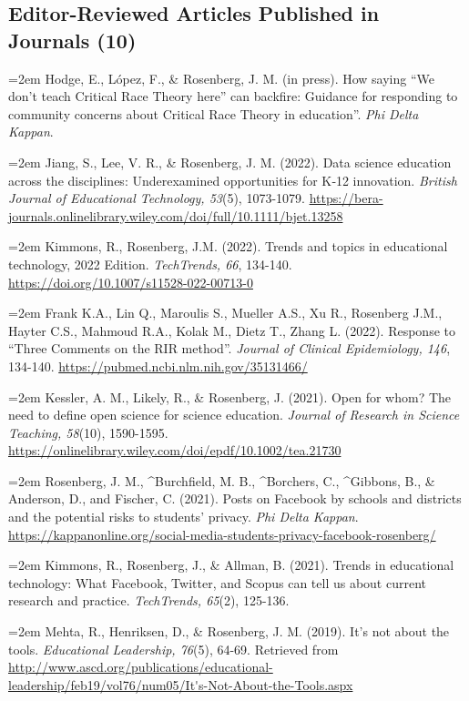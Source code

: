 \documentclass[
  14,
]{article}
\begin{document}
\hypertarget{editor-reviewed-articles-published-in-journals-10}{%
\subsection{Editor-Reviewed Articles Published in Journals
(10)}\label{editor-reviewed-articles-published-in-journals-10}}

\hangindent=2em Hodge, E., López, F., \& Rosenberg, J. M. (in press).
How saying ``We don't teach Critical Race Theory here'' can backfire:
Guidance for responding to community concerns about Critical Race Theory
in education''. \emph{Phi Delta Kappan}.

\hangindent=2em Jiang, S., Lee, V. R., \& Rosenberg, J. M. (2022). Data
science education across the disciplines: Underexamined opportunities
for K‐12 innovation. \emph{British Journal of Educational Technology,
53}(5), 1073-1079.
\url{https://bera-journals.onlinelibrary.wiley.com/doi/full/10.1111/bjet.13258}

\hangindent=2em Kimmons, R., Rosenberg, J.M. (2022). Trends and topics
in educational technology, 2022 Edition. \emph{TechTrends, 66}, 134-140.
\url{https://doi.org/10.1007/s11528-022-00713-0}

\hangindent=2em Frank K.A., Lin Q., Maroulis S., Mueller A.S., Xu R.,
Rosenberg J.M., Hayter C.S., Mahmoud R.A., Kolak M., Dietz T., Zhang L.
(2022). Response to ``Three Comments on the RIR method''. \emph{Journal
of Clinical Epidemiology, 146}, 134-140.
\url{https://pubmed.ncbi.nlm.nih.gov/35131466/}

\hangindent=2em Kessler, A. M., Likely, R., \& Rosenberg, J. (2021).
Open for whom? The need to define open science for science education.
\emph{Journal of Research in Science Teaching, 58}(10), 1590-1595.
\url{https://onlinelibrary.wiley.com/doi/epdf/10.1002/tea.21730}

\hangindent=2em Rosenberg, J. M., \^{}Burchfield, M. B., \^{}Borchers,
C., \^{}Gibbons, B., \& Anderson, D., and Fischer, C. (2021). Posts on
Facebook by schools and districts and the potential risks to students'
privacy. \emph{Phi Delta Kappan}.
\url{https://kappanonline.org/social-media-students-privacy-facebook-rosenberg/}

\hangindent=2em Kimmons, R., Rosenberg, J., \& Allman, B. (2021). Trends
in educational technology: What Facebook, Twitter, and Scopus can tell
us about current research and practice. \emph{TechTrends, 65}(2),
125-136.

\hangindent=2em Mehta, R., Henriksen, D., \& Rosenberg, J. M. (2019).
It's not about the tools. \emph{Educational Leadership, 76}(5), 64-69.
Retrieved from
\url{http://www.ascd.org/publications/educational-leadership/feb19/vol76/num05/It's-Not-About-the-Tools.aspx}
\end{document}
